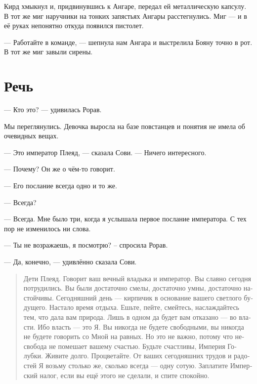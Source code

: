 \documentclass[a4paper,12pt,fleqn]{book}\usepackage{polyglossia}\setdefaultlanguage[babelshorthands=true]{russian}\setotherlanguage{english}\defaultfontfeatures{Ligatures=TeX,Mapping=tex-text}
\begin{document}
Кирд хмыкнул и, придвинувшись к Ангаре, передал ей металлическую капсулу.
В тот же миг наручники на тонких запястьях Ангары расстегнулись.
Миг --- и в её руках непонятно откуда появился пистолет.

--- Работайте в команде, --- шепнула нам Ангара и выстрелила Бояну точно в рот.
В тот же миг завыли сирены.

\section{Речь}

--- Кто это? --- удивилась Рорав.

Мы переглянулись.
Девочка выросла на базе повстанцев и понятия не имела об очевидных вещах.

--- Это император Плеяд, --- сказала Сови.
--- Ничего интересного.

--- Почему?
Он же о чём-то говорит.

--- Его послание всегда одно и то же.

--- Всегда?

--- Всегда.
Мне было три, когда я услышала первое послание императора.
С тех пор не изменилось ни слова.

--- Ты не возражаешь, я посмотрю? -- спросила Рорав.

--- Да, конечно, --- удивлённо сказала Сови.

\begin{quote}
Дети Плеяд.
Говорит ваш вечный владыка и император.
Вы славно сегодня потрудились.
Вы были достаточно смелы, достаточно умны, достаточно настойчивы.
Сегодняшний день --- кирпичик в основание вашего светлого будущего.
Настало время отдыха.
Ешьте, пейте, смейтесь, наслаждайтесь тем, что дала вам природа.
Лишь в одном да будет вам отказано --- во власти.
Ибо власть --- это Я.
Вы никогда не будете свободными, вы никогда не будете говорить со Мной на равных.
Но это не важно, потому что несвобода не помешает вашему счастью.
Будьте счастливы, Империя Голубки.
Живите долго.
Процветайте.
От ваших сегодняшних трудов и радостей Я возьму столько же, сколько всегда --- одну сотую.
Заплатите Имперский налог, если вы ещё этого не сделали, и спите спокойно.
\end{quote}
\end{document}
